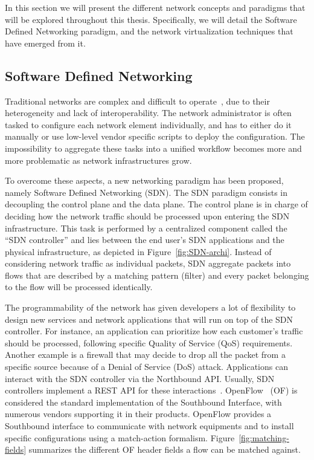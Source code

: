 In this section we will present the different network concepts and paradigms that will be explored throughout this thesis.
Specifically, we will detail the Software Defined Networking paradigm, and the network virtualization techniques that have emerged from it.

\subsection{Software Defined Networking}

Traditional networks are complex and difficult to operate~\cite{complexnetworks}, due to their heterogeneity and lack of interoperability. The network administrator is often tasked to configure each network element individually, and has to either do it manually or use low-level vendor specific scripts to deploy the configuration. The impossibility to aggregate these tasks into a unified workflow becomes more and more problematic as network infrastructures grow.

To overcome these aspects, a new networking paradigm has been proposed, namely Software Defined Networking (SDN).
The SDN paradigm consists in decoupling the control plane and the data plane.
The control plane is in charge of deciding how the network traffic should be processed upon entering the SDN infrastructure.
This task is performed by a centralized component called the ``SDN controller'' and lies between the end user's SDN applications and the physical infrastructure, as depicted in Figure~\ref{fig:SDN-archi}. Instead of considering network traffic as individual packets, SDN aggregate packets into flows that are described by a matching pattern (filter) and every packet belonging to the flow will be processed identically. 



The programmability of the network has given developers a lot of flexibility to design new services and network applications that will run on top of the SDN controller.
For instance, an application can prioritize how each customer's traffic should be processed, following specific Quality of Service (QoS) requirements.
Another example is a firewall that may decide to drop all the packet from a specific source because of a Denial of Service (DoS) attack.
Applications can interact with the SDN controller via the Northbound API.
Usually, SDN controllers implement a REST API for these interactions~\cite{onos-Berde2014a,opendaylight,floodlight}.
OpenFlow~\cite{Openflow-McKeown2008} (OF) is considered the standard implementation of the Southbound Interface, with numerous vendors supporting it in their products.
OpenFlow provides a Southbound interface to communicate with network equipments and to install specific configurations using a match-action formalism.
Figure~\ref{fig:matching-fields} summarizes the different OF header fields a flow can be matched against.


